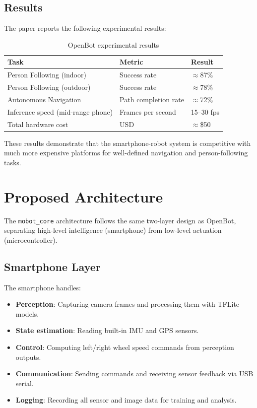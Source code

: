 \documentclass[12pt,a4paper]{article}
\begin{document}
\subsection{Results}

The paper reports the following experimental results:

\begin{table}[h!]
\centering
\begin{tabular}{lll}
\toprule
\textbf{Task} & \textbf{Metric} & \textbf{Result} \\
\midrule
Person Following (indoor) & Success rate & $\approx$87\% \\
Person Following (outdoor) & Success rate & $\approx$78\% \\
Autonomous Navigation & Path completion rate & $\approx$72\% \\
Inference speed (mid-range phone) & Frames per second & 15--30 fps \\
Total hardware cost & USD & $\approx$\$50 \\
\bottomrule
\end{tabular}
\caption{OpenBot experimental results \citep{openbot2021}}
\end{table}

These results demonstrate that the smartphone-robot system is competitive with much more
expensive platforms for well-defined navigation and person-following tasks.

\section{Proposed Architecture}
\label{sec:architecture}

The \texttt{mobot\_core} architecture follows the same two-layer design as OpenBot, separating
high-level intelligence (smartphone) from low-level actuation (microcontroller).

\subsection{Smartphone Layer}

The smartphone handles:
\begin{itemize}
    \item \textbf{Perception}: Capturing camera frames and processing them with TFLite models.
    \item \textbf{State estimation}: Reading built-in IMU and GPS sensors.
    \item \textbf{Control}: Computing left/right wheel speed commands from perception outputs.
    \item \textbf{Communication}: Sending commands and receiving sensor feedback via USB serial.
    \item \textbf{Logging}: Recording all sensor and image data for training and analysis.
\end{itemize}
\end{document}
